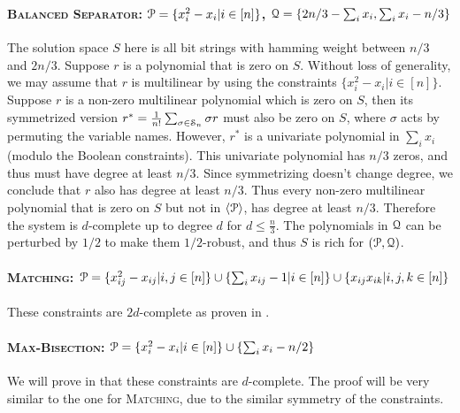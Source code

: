 \paragraph*{\textsc{Balanced Separator}: $\mathcal P = \{x_i^2 - x_i | i \in [n]\}$, $\mathcal Q = \{2n/3 - \sum_i x_i, \sum_i x_i - n/3\}$}
%
The solution space $S$ here is all bit strings with hamming weight between $n/3$ and $2n/3$. 
%
Suppose $r$ is a polynomial that is zero on $S$.  
%
Without loss of generality, we may assume that $r$ is multilinear by using the constraints $\{x_i^2 - x_i | i \in [n]\}$.
%
Suppose $r$ is a non-zero multilinear polynomial which is zero on $S$, then its symmetrized version $r^* = \frac{1}{n!}\sum_{\sigma \in \mathcal S_n} \sigma r$ must also be zero on $S$, where $\sigma$ acts by permuting the variable names. However, $r^*$ is a univariate polynomial in $\sum_i x_i$ (modulo the Boolean constraints). 
%
This univariate polynomial has $n/3$ zeros, and thus must have degree at least $n/3$. Since symmetrizing doesn't change degree, we conclude that $r$ also has degree at least $n/3$. Thus every non-zero multilinear polynomial that is zero on $S$ but not in $\langle \mathcal P\rangle$, has degree at least $n/3$. 
%
Therefore the system is $d$-complete up to degree $d$ for $d \leq \frac{n}{3}$.
%
The polynomials in $\mathcal Q$ can be perturbed by $1/2$ to make them $1/2$-robust, and thus $S$ is rich for $(\mathcal P, \mathcal Q)$. 

\paragraph*{\textsc{Matching}: $\mathcal P = \{x_{ij}^2 - x_{ij} | i,j \in [n]\} \cup \{\sum_i x_{ij} - 1 | i \in [n]\} \cup \{x_{ij}x_{ik} | i,j,k \in [n]\}$} These constraints are $2d$-complete as proven in \cite{Braun:2016:MPN:2884435.2884510}.

\paragraph*{\textsc{Max-Bisection}: $\mathcal P = \{x_i^2 - x_i | i \in [n]\} \cup \{\sum_i x_i - n/2\}$} We will prove in  that these constraints are $d$-complete. The proof will be very similar to the one for \textsc{Matching}, due to the similar symmetry of the constraints.

